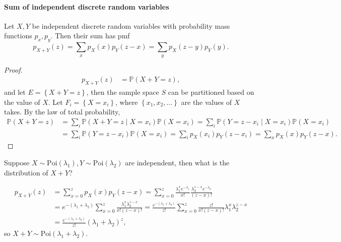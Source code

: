 \paragraph{Sum of independent discrete random variables}
\begin{proposition}
    Let \(X, Y\) be independent discrete random variables with probability mass functions \(p_x, p_y\). Then their sum has pmf 
    \[
        p_{X+Y}(z) = \sum_{x} p_X(x) p_Y(z - x) = \sum_{y} p_X(z - y) p_Y(y).  
    \]  
\end{proposition}

\begin{proof}
    \begin{align*}
        p_{X + Y}(z) &= \mathbb{P} (X + Y = z),
    \end{align*}
    and let \(E = \left\{ X + Y = z \right\} \), then the sample space \(S\) can be partitioned based on the value of \(X\). Let \(F_i = \left\{ X = x_i \right\} \), where \(\left\{ x_1, x_2, \dots  \right\} \) are the values of \(X\) takes. By the law of total probability,
    \begin{align*}
        \mathbb{P} (X + Y = z) &= \sum_{i} \mathbb{P} (X + Y = z \mid X = x_i) \mathbb{P} (X = x_i) = \sum_{i} \mathbb{P} (Y = z - x_i \mid X = x_i) \mathbb{P} (X = x_i) \\
        &= \sum_{i} \mathbb{P} (Y = z - x_i) \mathbb{P} (X = x_i) = \sum_{i} p_X(x_i) p_Y(z - x_i) = \sum_{x} p_X(x) p_Y(z - x).    
    \end{align*}      
\end{proof}

\begin{eg}
Suppose \(X \sim \mathrm{Poi}(\lambda_1), Y \sim \mathrm{Poi}(\lambda _2)  \) are independent, then what is the distribution of \(X + Y\)?  
\end{eg}

\begin{explanation}
    \begin{align*}
        p_{X + Y}(z) &= \sum_{x = 0}^z p_X(x) p_Y(z - x) = \sum_{x = 0}^z \frac{\lambda _1 ^x e^{-\lambda _1}}{x!} \frac{\lambda _2^{z - x} e^{-\lambda _2}}{(z - x)!} \\
        &= e^{-(\lambda _1 + \lambda _2)} \sum_{x=0}^z \frac{\lambda _1^x \lambda _2^{z - x}}{x! (z - x)!} = \frac{e^{-(\lambda _1 + \lambda _2)}}{z!} \sum_{x=0}^z \frac{z!}{x! (z - x)!} \lambda _1^x \lambda _2^{z - x} \\
        &= \frac{e^{-(\lambda_1 + \lambda _2)}}{z!} (\lambda _1 + \lambda _2)^z,   
    \end{align*}
    so \(X + Y \sim \mathrm{Poi}(\lambda _1 + \lambda _2) \). 
\end{explanation}

